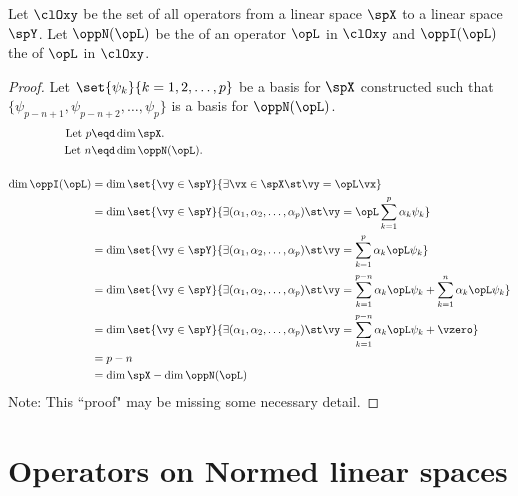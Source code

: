 \begin{theorem}
Let $\clOxy$ be the set of all operators from a linear space $\spX$ to a linear space $\spY$.
Let $\oppN(\opL)$ be the  of an operator $\opL$ in $\clOxy$
and $\oppI(\opL)$ the  of $\opL$ in $\clOxy$.
\thmbox{
  \dim \oppI(\opL) + \dim\oppN(\opL) = \dim \spX
  \qquad\scriptstyle
  \forall \opL\in\clOxy
  }
\end{theorem}
\begin{proof}
Let $\set{\psi_k}{k=1,2,\ldots,p}$ be a basis for $\spX$
constructed such that $\{\psi_{p-n+1},\psi_{p-n+2},\ldots,\psi_p\}$
is a basis for $\oppN(\opL)$.
\begin{align*}
  \text{Let } p &\eqd \dim\spX.         \\
  \text{Let } n &\eqd \dim\oppN(\opL).  \\
  \\
  \dim\oppI(\opL)
    &= \dim \set{\vy\in\spY}{\exists\vx\in\spX \st \vy=\opL\vx}
  \\&= \dim \set{\vy\in\spY}{\exists(\alpha_1,\alpha_2,\ldots,\alpha_p) \st \vy=\opL\sum_{k=1}^p\alpha_k\psi_k}
  \\&= \dim \set{\vy\in\spY}{\exists(\alpha_1,\alpha_2,\ldots,\alpha_p) \st
            \vy=\sum_{k=1}^p\alpha_k\opL\psi_k}
  \\&= \dim \set{\vy\in\spY}{\exists(\alpha_1,\alpha_2,\ldots,\alpha_p) \st
            \vy=\sum_{k=1}^{p-n}\alpha_k\opL\psi_k+\sum_{k=1}^n\alpha_k\opL\psi_k}
  \\&= \dim \set{\vy\in\spY}{\exists(\alpha_1,\alpha_2,\ldots,\alpha_p) \st
            \vy=\sum_{k=1}^{p-n}\alpha_k\opL\psi_k+\vzero}
  \\&= p-n
  \\&= \dim\spX - \dim\oppN(\opL)
\end{align*}
Note: This ``proof" may be missing some necessary detail. \problem
\end{proof}

\section{Operators on Normed linear spaces}

